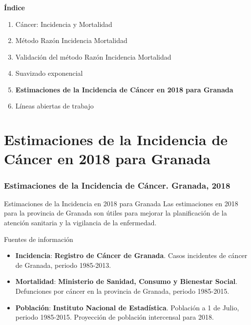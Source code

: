 \documentclass{beamer}
\begin{document}
\begin{frame}\frametitle{}

	\Large{\textbf{Índice}}\\[2ex]
	\normalsize
	\begin{enumerate}
		\item Cáncer: Incidencia y Mortalidad \\[2ex]
		\item Método Razón Incidencia Mortalidad \\[2ex]
		\item Validación del método Razón Incidencia Mortalidad \\[2ex]
		\item Suavizado exponencial \\[2ex]
		\item \textbf{ Estimaciones de la Incidencia de Cáncer en 2018 para Granada} \\[2ex]
		\item Líneas abiertas de trabajo
	\end{enumerate}

\end{frame}

\section{ Estimaciones de la Incidencia de Cáncer en 2018 para Granada}
\begin{frame}\frametitle{Estimaciones de la Incidencia de Cáncer. Granada, 2018}

	\begin{block}{Estimaciones de la Incidencia en 2018 para Granada}
		Las estimaciones en 2018 para la provincia de Granada son útiles para mejorar la planificación de la atención sanitaria y la vigilancia de la enfermedad.
	\end{block}

	\begin{block}{Fuentes de información}
		\begin{itemize}
			\item \textbf{Incidencia}: \textbf{Registro de Cáncer de Granada}. Casos incidentes de cáncer de Granada, periodo 1985-2013.
			\item \textbf{Mortalidad}: \textbf{Ministerio de Sanidad, Consumo y Bienestar Social}. Defunciones por cáncer en la provincia de Granada, periodo 1985-2015.
			\item \textbf{Población}: \textbf{Instituto Nacional de Estadística}. Población a 1 de Julio, periodo 1985-2015. Proyección de población intercensal para 2018.
		\end{itemize}
	\end{block}

\end{frame}
\end{document}
